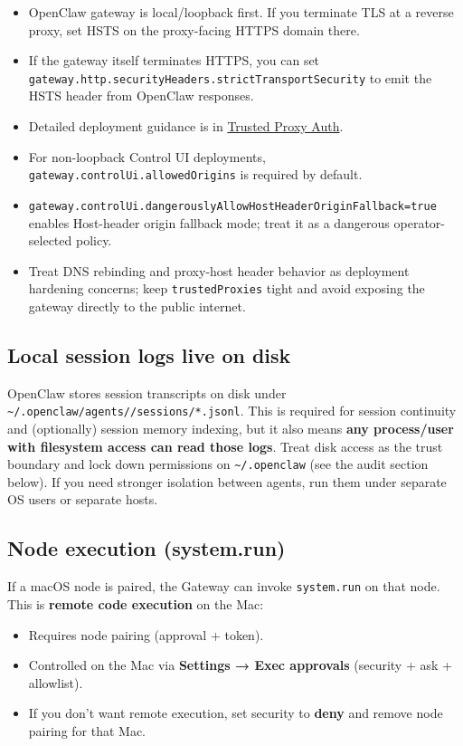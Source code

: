 \begin{itemize}
  \item OpenClaw gateway is local/loopback first. If you terminate TLS at a reverse proxy, set HSTS on the proxy-facing HTTPS domain there.
  \item If the gateway itself terminates HTTPS, you can set \texttt{gateway.http.securityHeaders.strictTransportSecurity} to emit the HSTS header from OpenClaw responses.
  \item Detailed deployment guidance is in \href{/gateway/trusted-proxy-auth\#tls-termination-and-hsts}{Trusted Proxy Auth}.
  \item For non-loopback Control UI deployments, \texttt{gateway.controlUi.allowedOrigins} is required by default.
  \item \texttt{gateway.controlUi.dangerouslyAllowHostHeaderOriginFallback=true} enables Host-header origin fallback mode; treat it as a dangerous operator-selected policy.
  \item Treat DNS rebinding and proxy-host header behavior as deployment hardening concerns; keep \texttt{trustedProxies} tight and avoid exposing the gateway directly to the public internet.
\end{itemize}


\subsection{Local session logs live on disk}


OpenClaw stores session transcripts on disk under \texttt{\textasciitilde{}/.openclaw/agents//sessions/*.jsonl}.
This is required for session continuity and (optionally) session memory indexing, but it also means
\textbf{any process/user with filesystem access can read those logs}. Treat disk access as the trust
boundary and lock down permissions on \texttt{\textasciitilde{}/.openclaw} (see the audit section below). If you need
stronger isolation between agents, run them under separate OS users or separate hosts.

\subsection{Node execution (system.run)}


If a macOS node is paired, the Gateway can invoke \texttt{system.run} on that node. This is \textbf{remote code execution} on the Mac:

\begin{itemize}
  \item Requires node pairing (approval + token).
  \item Controlled on the Mac via \textbf{Settings → Exec approvals} (security + ask + allowlist).
  \item If you don’t want remote execution, set security to \textbf{deny} and remove node pairing for that Mac.
\end{itemize}


